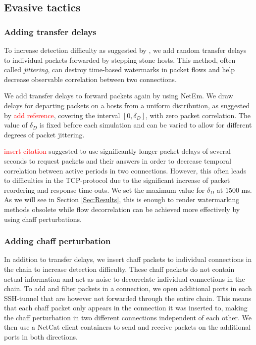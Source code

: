 \documentclass[runningheads]{llncs}\usepackage[]{graphicx}\usepackage[]{color}
\begin{document}


\subsection{Evasive tactics}
\subsubsection{Adding transfer delays}\label{Sec:delays_desc}

To increase detection difficulty as suggested by  \cite{padhye2010evading}, we add random transfer delays to individual packets forwarded by stepping stone hosts. This method, often called \textit{jittering}, can destroy time-based watermarks in packet flows and help decrease observable correlation between two connections. 

We add transfer delays to forward packets again by using NetEm. We draw delays for departing packets on a hosts from a uniform distribution, as suggested by \textcolor{red}{add reference}, covering the interval $[0,\delta_D]$, with zero packet correlation. The value of $\delta_D$ is fixed before each simulation and can be varied to allow for different degrees of packet jittering. 

\textcolor{red}{insert citation} suggested to use significantly longer packet delays of several seconds to request packets and their answers in order to decrease temporal correlation between active periods in two connections. However, this often leads to difficulties in the TCP-protocol due to the significant increase of packet reordering and response time-outs. We set the maximum value for  $\delta_D$  at $1500$ ms. As we will see in Section \ref{Sec:Results}, this is enough to render watermarking methods obsolete while flow decorrelation can be achieved more effectively by using chaff perturbations. 



\subsubsection{Adding chaff perturbation}\label{Sec:chaff_desc}

In addition to transfer delays, we insert chaff packets to individual connections in the chain to increase detection difficulty. These chaff packets do not contain actual information and act as noise to decorrelate individual connections in the chain. To add and filter packets in a connection, we open additional ports in each SSH-tunnel that are however not forwarded through the entire chain. This means that each chaff packet only appears in the connection it was inserted to, making the chaff perturbation in two different connections independent of each other. 
We then use a NetCat client containers to send and receive packets on the additional ports in both directions. %
\end{document}
